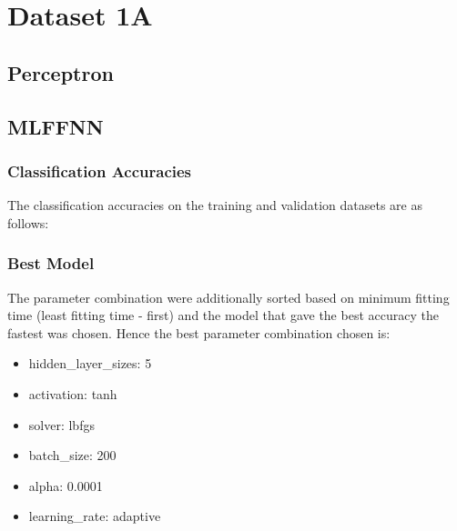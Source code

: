 \documentclass[11pt,a4paper]{article}
\begin{document}
{\hypersetup{linkcolor=black}
 \tableofcontents}
\break


\section{Dataset 1A}
\subsection{Perceptron}


\subsection{MLFFNN}
\subsubsection{Classification Accuracies}
The classification accuracies on the training and validation datasets are as follows:


\subsubsection{Best Model}
The parameter combination were additionally sorted based on minimum fitting time (least fitting time - first) and the model that gave the best accuracy the fastest was chosen. Hence the best parameter combination chosen is:
\begin{itemize}
    \itemsep0em
    \item hidden\_layer\_sizes: 5
    \item activation: tanh
    \item solver: lbfgs
    \item batch\_size: 200
    \item alpha: 0.0001
    \item learning\_rate: adaptive
\end{itemize}
\end{document}
